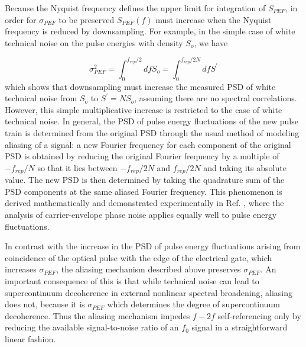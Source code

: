 Because the Nyquist frequency defines the upper limit for integration of $S_{PEF}$, in order for $\sigma_{PEF}$ to be preserved $S_{PEF}(f)$ must increase when the Nyquist frequency is reduced by downsampling. For example, in the simple case of white technical noise on the pulse energies with density $S_o$, we have

\begin{equation}
\sigma_{PEF}^2=\int_{0}^{f_{rep}/2}df S_o=\int_{0}^{f_{rep}/2N}df S^{'}
\end{equation}
which shows that downsampling must increase the measured PSD of white technical noise from $S_o$ to $S^{'}=NS_o$, assuming there are no spectral correlations. However, this simple multiplicative increase is restricted to the case of white technical noise. In general, the PSD of pulse energy fluctuations of the new pulse train is determined from the original PSD through the usual method of modeling aliasing of a signal: a new Fourier frequency for each component of the original PSD is obtained by reducing the original Fourier frequency by a multiple of $-f_{rep}/N$ so that it lies between $-f_{rep}/2N$ and $f_{rep}/2N$ and taking its absolute value. The new PSD is then determined by taking the quadrature sum of the PSD components at the same aliased Fourier frequency. This phenomenon is derived mathematically and demonstrated experimentally in Ref. \cite{Gohle2005}, where the analysis of carrier-envelope phase noise applies equally well to pulse energy fluctuations. 

In contrast with the increase in the PSD of pulse energy fluctuations arising from coincidence of the optical pulse with the edge of the electrical gate, which increases $\sigma_{PEF}$, the aliasing mechanism described above preserves $\sigma_{PEF}$. An important consequence of this is that while technical noise can lead to supercontinuum decoherence in external nonlinear spectral broadening, aliasing does not, because it is $\sigma_{PEF}$ which determines the degree of supercontinuum decoherence. Thus the aliasing mechanism impedes $f-2f$ self-referencing only by reducing the available signal-to-noise ratio of an $f_0$ signal in a straightforward linear fashion. 

